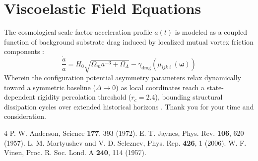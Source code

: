 \documentclass[reprint,amsmath,amssymb,aps,prd,nofootinbib]{revtex4-2}
\begin{document}
\section{Viscoelastic Field Equations}
The cosmological scale factor acceleration profile $a(t)$ is modeled as a coupled function of background substrate drag induced by localized mutual vortex friction components \cite{vinen1957}:
\begin{equation}
\frac{\dot{a}}{a} = H_0 \sqrt{\Omega_m a^{-3} + \Omega_\Lambda} - \gamma_{\text{drag}}\left(\mu_{ijk\ell}(\boldsymbol{\omega})\right)
\end{equation}
Wherein the configuration potential asymmetry parameters relax dynamically toward a symmetric baseline ($\Delta \to 0$) as local coordinates reach a state-dependent rigidity percolation threshold ($r_c = 2.4$), bounding structural dissipation cycles over extended historical horizons \cite{martyushev2006}. Thank you for your time and consideration.

\begin{thebibliography}{4}
 P. W. Anderson, Science {\bf 177}, 393 (1972).
 E. T. Jaynes, Phys. Rev. {\bf 106}, 620 (1957).
 L. M. Martyushev and V. D. Seleznev, Phys. Rep. {\bf 426}, 1 (2006).
 W. F. Vinen, Proc. R. Soc. Lond. A {\bf 240}, 114 (1957).
\end{thebibliography}
\end{document}
